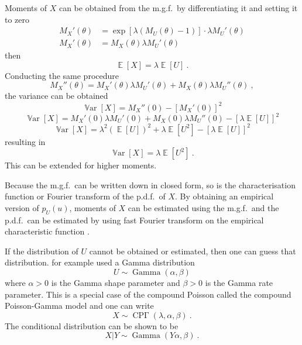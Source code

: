 \documentclass[12pt, a4paper]{memoir}
\DeclareMathOperator{\expectation}{\mathbb{E}}
\DeclareMathOperator{\variance}{\mathbb{V}ar}
\DeclareMathOperator{\gammaDist}{Gamma}
\DeclareMathOperator{\CPoisson}{CP\Gamma}
\begin{document}
Moments of $X$ can be obtained from the m.g.f.~by differentiating it and setting it to zero
\begin{align*}
	M_X'(\theta)&=\exp\left[\lambda\left(M_U(\theta)-1\right)\right]\cdot\lambda M_U'(\theta) \\
	M_X'(\theta)&=M_X(\theta)\lambda M_U'(\theta)
\end{align*}
then
\begin{equation}
	\expectation\left[X\right]=\lambda\expectation\left[U\right]
	\ .
\end{equation}
Conducting the same procedure
\begin{equation*}
	M_X''(\theta)=M_X'(\theta)\lambda M_U'(\theta)+M_X(\theta)\lambda M_U''(\theta)
	\ ,
\end{equation*}
the variance can be obtained
\begin{equation*}
	\variance\left[X\right]=M_X''(0)-\left[M_X'(0)\right]^2
\end{equation*}
\begin{equation*}
	\variance\left[X\right]=M_X'(0)\lambda M_U'(0)+M_X(0)\lambda M_U''(0)-\left[\lambda\expectation\left[U\right]\right]^2
\end{equation*}
\begin{equation*}
	\variance\left[X\right]=\lambda^2 \left(\expectation\left[U\right]\right)^2+\lambda \expectation\left[U^2\right]-\left[\lambda\expectation\left[U\right]\right]^2
\end{equation*}
resulting in
\begin{equation}
	\variance\left[X\right] = \lambda\expectation\left[U^2\right]
	\ .
\end{equation}
This can be extended for higher moments.

Because the m.g.f.~can be written down in closed form, so is the characterisation function or Fourier transform of the p.d.f.~of $X$. By obtaining an empirical version of $p_U(u)$, moments of $X$ can be estimated using the m.g.f.~and the p.d.f.~can be estimated by using fast Fourier transform on the empirical characteristic function \citep{whiting2006properties}.

If the distribution of $U$ cannot be obtained or estimated, then one can guess that distribution. \cite{xu2009electronic} for example used a Gamma distribution
\begin{equation}
	U\sim\gammaDist\left(\alpha,\beta\right)
\end{equation}
where $\alpha>0$ is the Gamma shape parameter and $\beta>0$ is the Gamma rate parameter. This is a special case of the compound Poisson called the compound Poisson-Gamma model and one can write
\begin{equation}
	X\sim\CPoisson(\lambda,\alpha,\beta)
	\ .
\end{equation}
The conditional distribution can be shown to be
\begin{equation}
	X|Y\sim\gammaDist\left(Y\alpha,\beta\right)
	\ .
\end{equation}
\end{document}
